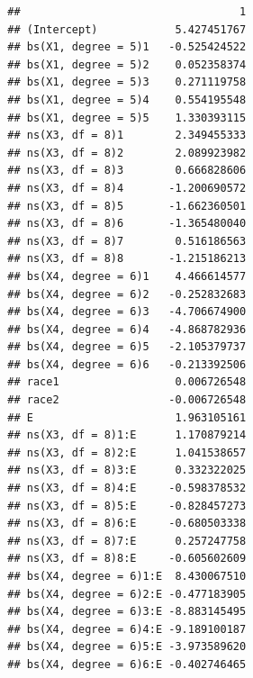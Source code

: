 \begin{knitrout}\scriptsize
	\color{fgcolor}\begin{kframe}
		\begin{verbatim}
		##                                  1
		## (Intercept)            5.427451767
		## bs(X1, degree = 5)1   -0.525424522
		## bs(X1, degree = 5)2    0.052358374
		## bs(X1, degree = 5)3    0.271119758
		## bs(X1, degree = 5)4    0.554195548
		## bs(X1, degree = 5)5    1.330393115
		## ns(X3, df = 8)1        2.349455333
		## ns(X3, df = 8)2        2.089923982
		## ns(X3, df = 8)3        0.666828606
		## ns(X3, df = 8)4       -1.200690572
		## ns(X3, df = 8)5       -1.662360501
		## ns(X3, df = 8)6       -1.365480040
		## ns(X3, df = 8)7        0.516186563
		## ns(X3, df = 8)8       -1.215186213
		## bs(X4, degree = 6)1    4.466614577
		## bs(X4, degree = 6)2   -0.252832683
		## bs(X4, degree = 6)3   -4.706674900
		## bs(X4, degree = 6)4   -4.868782936
		## bs(X4, degree = 6)5   -2.105379737
		## bs(X4, degree = 6)6   -0.213392506
		## race1                  0.006726548
		## race2                 -0.006726548
		## E                      1.963105161
		## ns(X3, df = 8)1:E      1.170879214
		## ns(X3, df = 8)2:E      1.041538657
		## ns(X3, df = 8)3:E      0.332322025
		## ns(X3, df = 8)4:E     -0.598378532
		## ns(X3, df = 8)5:E     -0.828457273
		## ns(X3, df = 8)6:E     -0.680503338
		## ns(X3, df = 8)7:E      0.257247758
		## ns(X3, df = 8)8:E     -0.605602609
		## bs(X4, degree = 6)1:E  8.430067510
		## bs(X4, degree = 6)2:E -0.477183905
		## bs(X4, degree = 6)3:E -8.883145495
		## bs(X4, degree = 6)4:E -9.189100187
		## bs(X4, degree = 6)5:E -3.973589620
		## bs(X4, degree = 6)6:E -0.402746465
		\end{verbatim}
	\end{kframe}
\end{knitrout}
